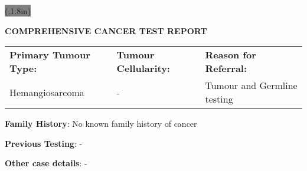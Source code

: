 \documentclass[8pt,letterpaper]{extarticle}
\begin{document}
\colorbox{gray}{\makebox(\textwidth,1.8in){}}

\begin{center}
\bf COMPREHENSIVE CANCER TEST REPORT
\end{center}

\hspace{-1ex}
\begin{tabular}{p{} p{} p{} }
{\bf Primary Tumour Type:} & {\bf Tumour Cellularity:} & {\bf Reason for Referral:} \\
Hemangiosarcoma &  - & Tumour and Germline testing\\
\end{tabular}

{\bf Family History}: No known family history of cancer 

{\bf Previous Testing}: -

{\bf Other case details}: -
\end{document}

